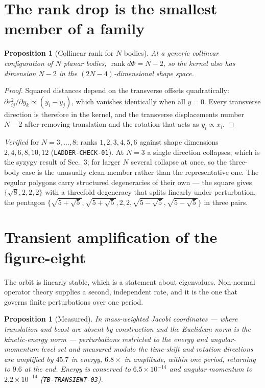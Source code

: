 \documentclass[11pt]{article}
\renewcommand{\S}{Sec.~}
\newtheorem{proposition}[theorem]{Proposition}
\theoremstyle{remark}
\begin{document}
\section{The rank drop is the smallest member of a family}

\begin{proposition}[Collinear rank for $N$ bodies]\label{p:rankN}
At a generic collinear configuration of $N$ planar bodies, $\operatorname{rank}d\Phi=N-2$,
so the kernel also has dimension $N-2$ in the $(2N-4)$-dimensional shape space.
\end{proposition}
\begin{proof}
Squared distances depend on the transverse offsets quadratically:
$\partial r_{ij}^2/\partial y_k \propto (y_i-y_j)$, which vanishes identically when all
$y=0$. Every transverse direction is therefore in the kernel, and the transverse
displacements number $N-2$ after removing translation and the rotation that acts as
$y_i\propto x_i$.
\end{proof}

\noindent
\emph{Verified} for $N=3,\dots,8$: ranks $1,2,3,4,5,6$ against shape dimensions
$2,4,6,8,10,12$ (\texttt{LADDER-CHECK-01}). At $N=3$ a single direction collapses, which is
the syzygy result of \S3; for larger $N$ several collapse at once, so the three-body case is
the unusually clean member rather than the representative one. The regular polygons carry
structured degeneracies of their own --- the square gives $\{\sqrt8,2,2,2\}$ with a
threefold degeneracy that splits linearly under perturbation, the pentagon
$\{\sqrt{5+\sqrt5},\sqrt{5+\sqrt5},2,2,\sqrt{5-\sqrt5},\sqrt{5-\sqrt5}\}$ in three pairs.

\section{Transient amplification of the figure-eight}\label{s:transient}

The orbit is linearly stable, which is a statement about eigenvalues. Non-normal operator
theory supplies a second, independent rate, and it is the one that governs finite
perturbations over one period.

\begin{proposition}[Measured]\label{p:transient}
In mass-weighted Jacobi coordinates --- where translation and boost are absent by
construction and the Euclidean norm is the kinetic-energy norm --- perturbations restricted
to the energy and angular-momentum level set and measured modulo the time-shift and
rotation directions are amplified by $45.7$ in energy, $6.8\times$ in amplitude, within one
period, returning to $9.6$ at the end. Energy is conserved to $6.5\times10^{-14}$ and
angular momentum to $2.2\times10^{-14}$ (\texttt{TB-TRANSIENT-03}).
\end{proposition}
\end{document}
